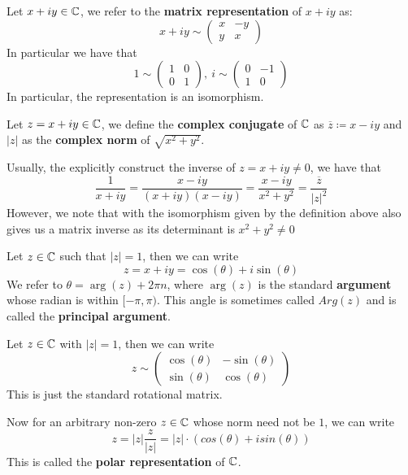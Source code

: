 \documentclass{article}
\begin{document}
\begin{definition}
    Let $x + iy \in \mathbb{C}$, we refer to the \textbf{matrix representation} of $x + iy$ as:
    \[x + iy \sim \begin{pmatrix} x & -y\\ y & x\end{pmatrix}\]
    In particular we have that
    \[1 \sim \begin{pmatrix} 1 & 0\\ 0 & 1\end{pmatrix},\ i \sim \begin{pmatrix}
    0 & -1 \\ 1 & 0
    \end{pmatrix}\]
    In particular, the representation is an isomorphism.
\end{definition}

\begin{definition}
    Let $z = x + iy \in \mathbb{C}$, we define the \textbf{complex conjugate} of $\mathbb{C}$ as $\overline{z} \coloneqq x - iy$ and $|z|$ as the \textbf{complex norm} of $\sqrt{x^2 + y^2}$.
\end{definition}

\begin{remark}
    Usually, the explicitly construct the inverse of $z = x + iy \neq 0$, we have that
    \[\frac{1}{x + iy} = \frac{x - iy}{(x + iy)(x - iy)} = \frac{x - iy}{x^2 + y^2} = \frac{\overline{z}}{|z|^2}\]
    However, we note that with the isomorphism given by the definition above also gives us a matrix inverse as its determinant is $x^2 + y^2 \neq 0$ 
\end{remark}

\begin{definition}
Let $z \in \mathbb{C}$ such that $|z| = 1$, then we can write
\[z = x + iy = \cos(\theta) + i \sin(\theta)\]
We refer to $\theta = \arg(z) + 2 \pi n$, where $\arg(z)$ is the standard \textbf{argument} whose radian is within $[-\pi, \pi)$. This angle is sometimes called $Arg(z)$ and is called the \textbf{principal argument}.
\end{definition}

\noindent Let $z \in \mathbb{C}$ with $|z| = 1$, then we can write
\[z \sim \begin{pmatrix} \cos(\theta) & -\sin(\theta)\\ \sin(\theta) & \cos(\theta) \end{pmatrix}\]
This is just the standard rotational matrix.

\noindent Now for an arbitrary non-zero $z \in \mathbb{C}$ whose norm need not be $1$, we can write
\[z = |z| \frac{z}{|z|} = |z| \cdot (cos(\theta) + i sin(\theta))\]
This is called the \textbf{polar representation} of $\mathbb{C}$.
\end{document}
